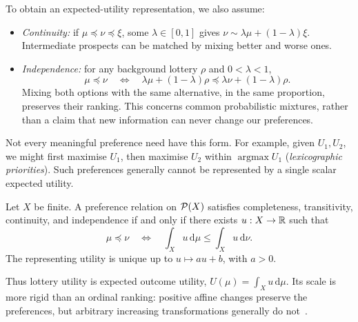 To obtain an expected-utility representation, we also assume:
\begin{itemize}
  \item \emph{Continuity:} if $\mu\preceq\nu\preceq\xi$, some $\lambda\in[0,1]$ gives $\nu\sim\lambda\mu+(1-\lambda)\xi$. Intermediate prospects can be matched by mixing better and worse ones.
  \item \emph{Independence:} for any background lottery $\rho$ and $0<\lambda<1$,
  \[
    \mu\preceq\nu
    \quad\Longleftrightarrow\quad
    \lambda\mu+(1-\lambda)\rho
    \preceq\lambda\nu+(1-\lambda)\rho.
  \]
  Mixing both options with the same alternative, in the same proportion, preserves their ranking. This concerns common probabilistic mixtures, rather than a claim that new information can never change our preferences.
\end{itemize}
Not every meaningful preference need have this form. For example, given $U_1,U_2$, we might first maximise $U_1$, then maximise $U_2$ within $\operatorname{argmax}U_1$ (\emph{lexicographic priorities}). Such preferences generally cannot be represented by a single scalar expected utility.

\begin{theorem}
Let $X$ be finite. A preference relation on $\mathcal{P}(X)$ satisfies completeness, transitivity, continuity, and independence if and only if there exists $u:X\to\mathbb{R}$ such that
\[
  \mu\preceq\nu
  \quad\Longleftrightarrow\quad
  \int_X u\,\mathrm{d}\mu \leq \int_X u\,\mathrm{d}\nu.
\]
The representing utility is unique up to $u\mapsto au+b$, with $a>0$.
\end{theorem}
Thus lottery utility is expected outcome utility, $U(\mu)=\int_X u\,\mathrm{d}\mu$. Its scale is more rigid than an ordinal ranking: positive affine changes preserve the preferences, but arbitrary increasing transformations generally do not~\cite[Section~5]{rosas2026preferences}.

\par\medskip
\noindent{}
\par\medskip

